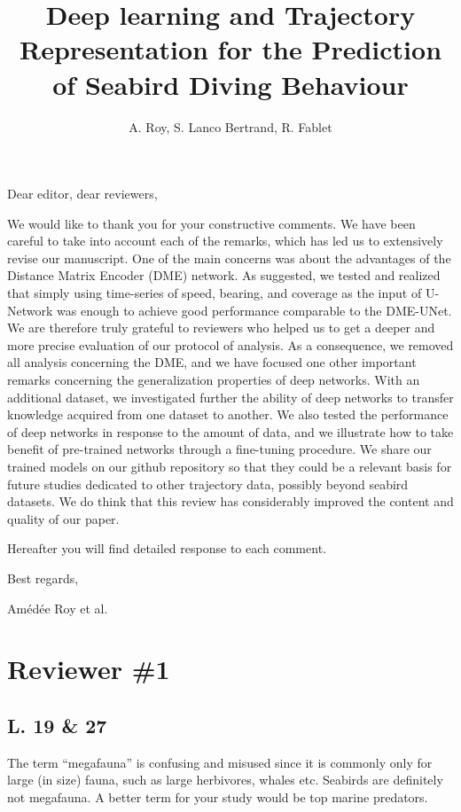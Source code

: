 \documentclass{ar2rc}
\title{Deep learning and Trajectory Representation for the Prediction of Seabird Diving Behaviour}
\author{A. Roy, S. Lanco Bertrand, R. Fablet}
\begin{document}
\maketitle

\section*{}

Dear editor, dear reviewers,

We would like to thank you for your constructive comments. We have been careful to take into account each of the remarks, which has led us to extensively revise our manuscript. One of the main concerns was about the advantages of the Distance Matrix Encoder (DME) network. As suggested, we tested and realized that simply using time-series of speed, bearing, and coverage as the input of U-Network was enough to achieve good performance comparable to the DME-UNet. We are therefore truly grateful to reviewers who helped us to get a deeper and more precise evaluation of our protocol of analysis. As a consequence, we removed all analysis concerning the DME, and we have focused one other important remarks concerning the generalization properties of deep networks. With an additional dataset, we investigated further the ability of deep networks to transfer knowledge acquired from one dataset to another. We also tested the performance of deep networks in response to the amount of data, and we illustrate how to take benefit of pre-trained networks through a fine-tuning procedure. We share our trained models on our github repository so that they could be a relevant basis for future studies dedicated to other trajectory data, possibly beyond seabird datasets. We do think that this review has considerably improved the content and quality of our paper.

Hereafter you will find detailed response to each comment.

Best regards,

Amédée Roy et al.

\section*{Reviewer \#1}

\subsection*{L. 19 \& 27}

\RC The term “megafauna” is confusing and misused since it is commonly only for large (in size) fauna, such as large herbivores, whales etc. Seabirds are definitely not megafauna. A better term for your study would be top marine predators.
\end{document}
